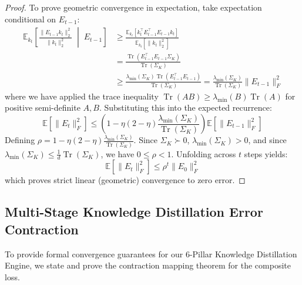 \documentclass{article}
\begin{document}
\begin{proof}
To prove geometric convergence in expectation, take expectation conditional on $E_{t-1}$:
\begin{align}
    \mathbb{E}_{k_t}\left[ \frac{\|E_{t-1} k_t\|_2^2}{\|k_t\|_2^2} \;\middle|\; E_{t-1} \right] &\ge \frac{\mathbb{E}_{k_t}[k_t^\top E_{t-1}^\top E_{t-1} k_t]}{\mathbb{E}_{k_t}[\|k_t\|_2^2]} \nonumber \\
    &= \frac{\operatorname{Tr}(E_{t-1}^\top E_{t-1} \Sigma_K)}{\operatorname{Tr}(\Sigma_K)} \nonumber \\
    &\ge \frac{\lambda_{\min}(\Sigma_K) \operatorname{Tr}(E_{t-1}^\top E_{t-1})}{\operatorname{Tr}(\Sigma_K)} = \frac{\lambda_{\min}(\Sigma_K)}{\operatorname{Tr}(\Sigma_K)} \|E_{t-1}\|_F^2
\end{align}
where we have applied the trace inequality $\operatorname{Tr}(A B) \ge \lambda_{\min}(B) \operatorname{Tr}(A)$ for positive semi-definite $A, B$.
Substituting this into the expected recurrence:
\begin{equation}
    \mathbb{E}[\|E_t\|_F^2] \le \left( 1 - \eta(2 - \eta) \frac{\lambda_{\min}(\Sigma_K)}{\operatorname{Tr}(\Sigma_K)} \right) \mathbb{E}[\|E_{t-1}\|_F^2]
\end{equation}
Defining $\rho = 1 - \eta(2 - \eta) \frac{\lambda_{\min}(\Sigma_K)}{\operatorname{Tr}(\Sigma_K)}$. Since $\Sigma_K \succ 0$, $\lambda_{\min}(\Sigma_K) > 0$, and since $\lambda_{\min}(\Sigma_K) \le \frac{1}{d} \operatorname{Tr}(\Sigma_K)$, we have $0 \le \rho < 1$. Unfolding across $t$ steps yields:
\begin{equation}
    \mathbb{E}[\|E_t\|_F^2] \le \rho^t \|E_0\|_F^2
\end{equation}
which proves strict linear (geometric) convergence to zero error.
\end{proof}

\subsection{Multi-Stage Knowledge Distillation Error Contraction}
To provide formal convergence guarantees for our 6-Pillar Knowledge Distillation Engine, we state and prove the contraction mapping theorem for the composite loss.
\end{document}
